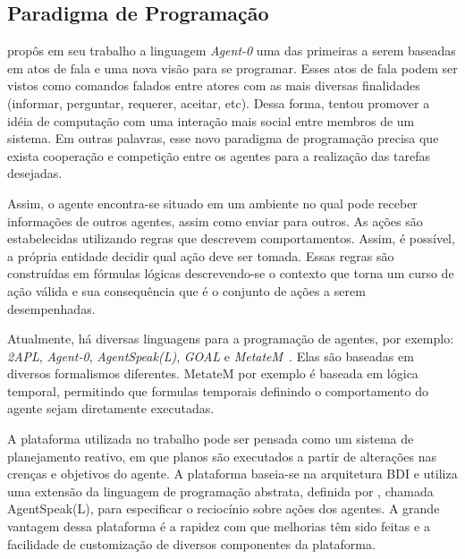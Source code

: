 \subsection{Paradigma de Programação}

\citet{shoham1993agent} propôs em seu trabalho a linguagem \emph{Agent-0} uma
das primeiras a serem baseadas em atos de fala e uma nova visão para se
programar.  Esses atos de fala podem ser vistos como comandos falados entre
atores com as mais diversas finalidades (informar, perguntar, requerer,
aceitar, etc).  Dessa forma, \citeauthor{shoham1993agent} tentou promover a
idéia de computação com uma interação mais social entre membros de um sistema.
Em outras palavras, esse novo paradigma de programação precisa que exista
cooperação e competição entre os agentes para a realização das tarefas
desejadas.

Assim, o agente encontra-se situado em um ambiente no qual pode receber
informações de outros agentes, assim como enviar para outros.  As ações são
estabelecidas utilizando regras que descrevem comportamentos. Assim, é
possível, a própria entidade decidir qual ação deve ser tomada. Essas regras
são construídas em fórmulas lógicas descrevendo-se o contexto que torna um
curso de ação válida e sua consequência que é o conjunto de ações a serem
desempenhadas.

Atualmente, há diversas linguagens para a programação de agentes, por exemplo:
\emph{2APL}, \emph{Agent-0}, \emph{AgentSpeak(L)}, \emph{GOAL} e
\emph{MetateM}~\cite{bordini2009multi}. Elas são baseadas em diversos
formalismos diferentes. MetateM por exemplo é baseada em lógica temporal,
permitindo que formulas temporais definindo o comportamento do agente sejam
diretamente executadas.

A plataforma \jason \cite{bordini-jason} utilizada no trabalho pode ser
pensada como um sistema de planejamento reativo, em que planos são executados
a partir de alterações nas crenças e objetivos do agente. A plataforma
baseia-se na arquitetura BDI e utiliza uma extensão da linguagem de
programação abstrata, definida por \citet{rao1996agentspeak}, chamada
AgentSpeak(L), para especificar o reciocínio sobre ações dos agentes. A grande
vantagem dessa plataforma é a rapidez com que melhorias têm sido feitas e a
facilidade de customização de diversos componentes da plataforma.


